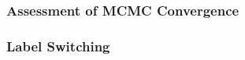 \documentclass{article}
\begin{document}
\subsubsection{Assessment of MCMC Convergence}

\subsubsection{Label Switching}
\end{document}
